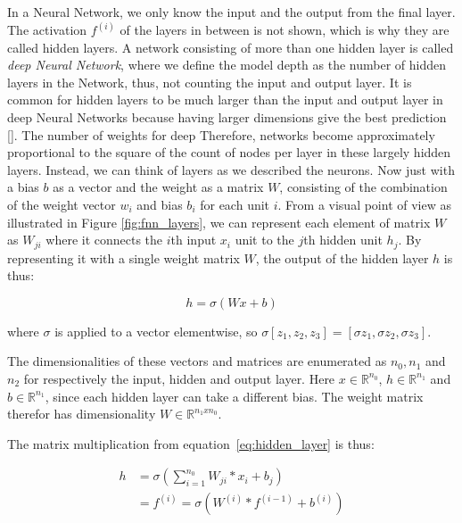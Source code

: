 In a Neural Network, we only know the
input and the output from the final layer. The activation  $f^{(i)}$ of the layers in between is not shown, which is why
they are called hidden layers. A network consisting of more than one hidden layer is called \emph{deep Neural Network}, where we define the model depth as the number of hidden layers in the Network, thus, not counting the input and output layer. 
It is common for hidden layers to be much larger than
the input and output layer in deep Neural Networks because having larger dimensions give the best prediction [\cite{Goodfellow-et-al-2016}].  The number of weights for deep
Therefore, networks become approximately proportional to the square of the count of
nodes per layer in these largely hidden layers. Instead, we can think of layers as we described the neurons. Now just with a bias $b$ as a vector and the weight as a matrix $W$, consisting
of the combination of the weight vector $w_i$ and bias $b_i$ for each unit $i$. From a visual point of view as illustrated in Figure \ref{fig:fnn_layers}, we can represent each element of matrix $W$ as $W_{ji}$ where it connects the   $i$th input $x_i$ unit to the $j$th hidden unit $h_j$. By representing it with a single weight matrix $W$, the output of the hidden layer $h$ is thus:

\begin{equation}
  h = \sigma(W x + b)
  \label{eq:hidden_layer}
\end{equation}

where $\sigma$ is applied to a vector elementwise, so $\sigma[z_1,z_2,z_3] = [\sigma z_1,\sigma z_2, \sigma z_3]$.

The dimensionalities of these vectors
and matrices are enumerated as $n_0, n_1$ and $n_2$ for respectively the input, hidden and output layer. Here $x \in \mathbb{R}^{n_0}$, $h \in \mathbb{R}^{n_1}$ and $b \in \mathbb{R}^{n_1}$, since each hidden layer can take a different bias. The weight matrix therefor has dimensionality $W \in \mathbb{R}^{n_1 x n_0}$.

The matrix multiplication from equation~\ref{eq:hidden_layer} is thus:

\begin{equation}
    \begin{split}
  h & = \sigma \left(\sum^{n_0}_{i =1}  W_{ji} * x_i  + b_j\right) \\
  &= f^{(i)} = \sigma (W^{(i)} *  f^{(i-1)}  + b^{(i)})
    \end{split}
\end{equation}

